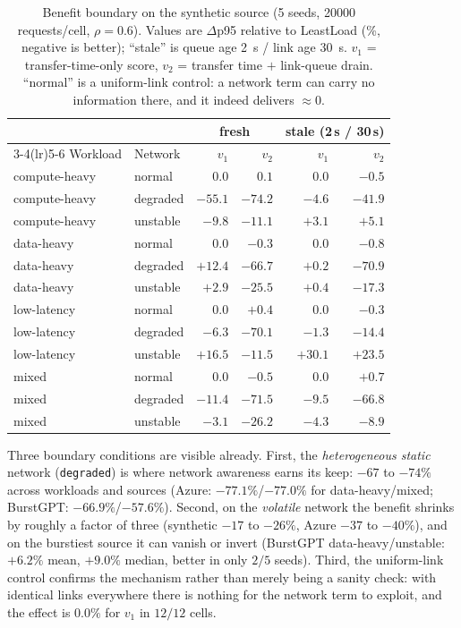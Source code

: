 \begin{table}[t]
\centering
\caption{Benefit boundary on the synthetic source (5 seeds, \num{20000} requests/cell,
$\rho=0.6$). Values are $\Delta$p95 relative to LeastLoad (\%, negative is better);
``stale'' is queue age \SI{2}{\second} / link age \SI{30}{\second}. $v_1$ = transfer-time-only
score, $v_2$ = transfer time $+$ link-queue drain. ``normal'' is a uniform-link control: a
network term can carry no information there, and it indeed delivers $\approx0$.}
\label{tab:rq1main}
\small
\begin{tabular}{@{}llrrrr@{}}
\toprule
& & \multicolumn{2}{c}{fresh} & \multicolumn{2}{c}{stale (2\,s / 30\,s)} \\
\cmidrule(lr){3-4}\cmidrule(lr){5-6}
Workload & Network & $v_1$ & $v_2$ & $v_1$ & $v_2$ \\
\midrule
compute-heavy & normal   & $0.0$   & $0.1$   & $0.0$   & $-0.5$ \\
compute-heavy & degraded & $-55.1$ & $-74.2$ & $-4.6$  & $-41.9$ \\
compute-heavy & unstable & $-9.8$  & $-11.1$ & $+3.1$  & $+5.1$ \\
data-heavy    & normal   & $0.0$   & $-0.3$  & $0.0$   & $-0.8$ \\
data-heavy    & degraded & $\mathbf{+12.4}$ & $\mathbf{-66.7}$ & $+0.2$ & $-70.9$ \\
data-heavy    & unstable & $+2.9$  & $-25.5$ & $+0.4$  & $-17.3$ \\
low-latency   & normal   & $0.0$   & $+0.4$  & $0.0$   & $-0.3$ \\
low-latency   & degraded & $-6.3$  & $-70.1$ & $-1.3$  & $-14.4$ \\
low-latency   & unstable & $+16.5$ & $-11.5$ & $+30.1$ & $+23.5$ \\
mixed         & normal   & $0.0$   & $-0.5$  & $0.0$   & $+0.7$ \\
mixed         & degraded & $-11.4$ & $-71.5$ & $-9.5$  & $-66.8$ \\
mixed         & unstable & $-3.1$  & $-26.2$ & $-4.3$  & $-8.9$ \\
\bottomrule
\end{tabular}
\end{table}

Three boundary conditions are visible already. First, the \emph{heterogeneous static} network
(\texttt{degraded}) is where network awareness earns its keep: $-67$ to $-74\%$ across workloads
and sources (Azure: $-77.1\%$/$-77.0\%$ for data-heavy/mixed; BurstGPT: $-66.9\%$/$-57.6\%$).
Second, on the \emph{volatile} network the benefit shrinks by roughly a factor of three
(synthetic $-17$ to $-26\%$, Azure $-37$ to $-40\%$), and on the burstiest source it can vanish
or invert (BurstGPT data-heavy/unstable: $+6.2\%$ mean, $+9.0\%$ median, better in only $2/5$
seeds). Third, the uniform-link control confirms the mechanism rather than merely being a
sanity check: with identical links everywhere there is nothing for the network term to
exploit, and the effect is $0.0\%$ for $v_1$ in $12/12$ cells.

